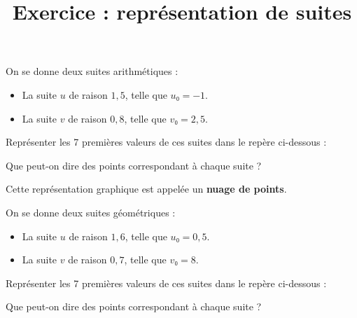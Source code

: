 \documentclass[
	classe=$1^{ere}STI2D$,
	landscape,
	twocolumn
]{exercice}
\title{Exercice : représentation de suites}
\begin{document}
\maketitle

\begin{exercice}
	On se donne deux suites arithmétiques :
	\begin{itemize}
		\item La suite $u$ de raison $1,5$, telle que $u₀ = -1$.
		\item La suite $v$ de raison $0,8$, telle que $v₀ = 2,5$.
	\end{itemize}

	Représenter les 7 premières valeurs de ces suites dans le repère ci-dessous :
	\begin{center}
	\end{center}

	Que peut-on dire des points correspondant à chaque suite ?
\end{exercice}

\newpage

\begin{tcolorbox}
	Cette représentation graphique est appelée un \textbf{nuage de points}.
\end{tcolorbox}

\begin{exercice}
	On se donne deux suites géométriques :
	\begin{itemize}
		\item La suite $u$ de raison $1,6$, telle que $u₀ = 0,5$.
		\item La suite $v$ de raison $0,7$, telle que $v₀ = 8$.
	\end{itemize}

	Représenter les 7 premières valeurs de ces suites dans le repère ci-dessous :
	\begin{center}
	\end{center}

	Que peut-on dire des points correspondant à chaque suite ?
\end{exercice}
\end{document}
